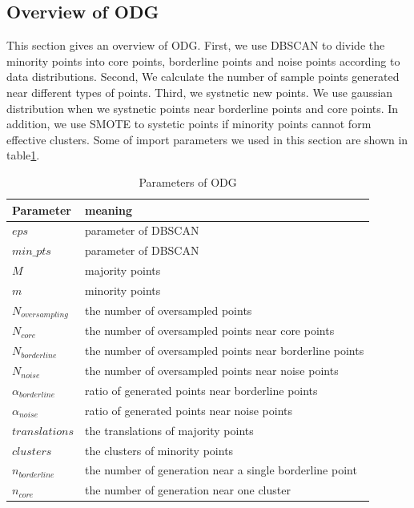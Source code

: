\documentclass[ida]{iosart2x}
\begin{document}
\subsection{Overview of ODG}
This section gives an overview of ODG. 
First, we use DBSCAN to divide the minority points into core points, 
borderline points and noise points according 
to data distributions. 
Second, We calculate the number of sample points generated near different types of points.
Third, we systnetic new points.
We use gaussian distribution when we systnetic points near borderline points and core points.
In addition, we use SMOTE to systetic points if minority points cannot form effective clusters.
Some of import parameters we used in this section are shown in table\ref{table15}.
\begin{table}[]
  \caption{Parameters of ODG}
  \label{table15}
  \begin{tabular}{ll}
  \hline
  Parameter             & meaning                                                 \\ \hline
  $eps$                 & parameter of DBSCAN                                     \\
  $min\_pts$            & parameter of DBSCAN                                     \\
  $M$                   & majority points                                         \\
  $m$                   & minority points                                         \\
  $N_{oversampling}$    & the number of oversampled points                        \\
  $N_{core}$            & the number of oversampled points near core points       \\
  $N_{borderline}$      & the number of oversampled points near borderline points \\
  $N_{noise}$           & the number of oversampled points near noise points      \\
  $\alpha_{borderline}$ & ratio of generated points near borderline points        \\
  $\alpha_{noise}$      & ratio of generated points near noise points             \\
  $translations$        & the translations of majority points                     \\
  $clusters$            & the clusters of minority points                         \\ 
  $n_{borderline}$      & the number of generation near a single borderline point \\ 
  $n_{core}$            & the number of generation near one cluster               \\ \hline
  \end{tabular}
  \end{table}
\end{document}
